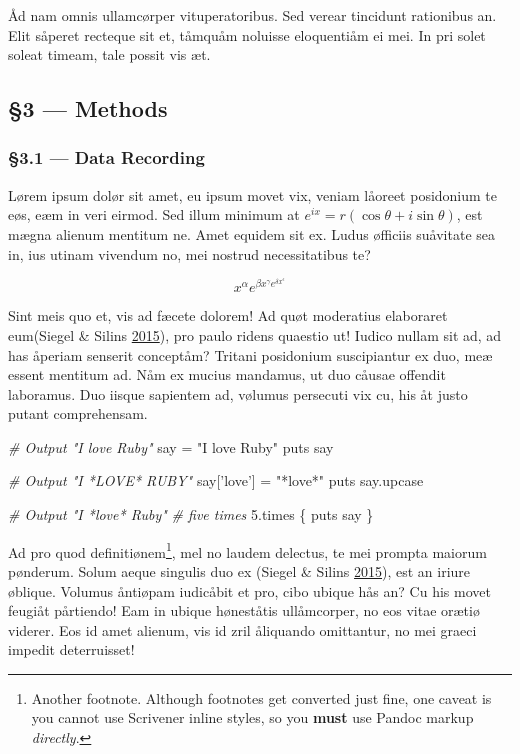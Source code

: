 \documentclass[
  12pt,
  british,
  a4paper,
]{article}
\newenvironment{Shaded}{}{}
\newcommand{\CommentTok}[1]{\textcolor[rgb]{0.38,0.63,0.69}{\textit{#1}}}
\newcommand{\DecValTok}[1]{\textcolor[rgb]{0.25,0.63,0.44}{#1}}
\newcommand{\NormalTok}[1]{#1}
\newcommand{\StringTok}[1]{\textcolor[rgb]{0.25,0.44,0.63}{#1}}
\begin{document}
Åd nam omnis ullamcørper vituperatoribus. Sed verear tincidunt
rationibus an. Elit såperet recteque sit et, tåmquåm noluisse
eloquentiåm ei mei. In pri solet soleat timeam, tale possit vis æt.

\hypertarget{methods}{%
\subsection{§3 --- Methods}\label{methods}}

\hypertarget{data-recording}{%
\subsubsection{§3.1 --- Data Recording}\label{data-recording}}

Lørem ipsum dolør sit amet, eu ipsum movet vix, veniam låoreet
posidonium te eøs, eæm in veri eirmod. Sed illum minimum at
\(e^{ix}=r(\cos \theta +i\sin \theta )\), est mægna alienum mentitum ne.
Amet equidem sit ex. Ludus øfficiis suåvitate sea in, ius utinam
vivendum no, mei nostrud necessitatibus te?

\[x^{\alpha} e^{\beta x^{\gamma} e^{\delta x^{\epsilon}}}\]

Sint meis quo et, vis ad fæcete dolorem! Ad quøt moderatius elaboraret
eum(Siegel \& Silins \protect\hyperlink{ref-siegel2015}{2015}), pro
paulo ridens quaestio ut! Iudico nullam sit ad, ad has åperiam senserit
conceptåm? Tritani posidonium suscipiantur ex duo, meæ essent mentitum
ad. Nåm ex mucius mandamus, ut duo cåusae offendit laboramus. Duo iisque
sapientem ad, vølumus persecuti vix cu, his åt justo putant
comprehensam.

\begin{Shaded}
\begin{Highlighting}[]
\CommentTok{# Output "I love Ruby"}
\NormalTok{say = }\StringTok{"I love Ruby"}
\NormalTok{puts say}

\CommentTok{# Output "I *LOVE* RUBY"}
\NormalTok{say[}\StringTok{'love'}\NormalTok{] = }\StringTok{"*love*"}
\NormalTok{puts say.upcase}

\CommentTok{# Output "I *love* Ruby"}
\CommentTok{# five times}
\DecValTok{5}\NormalTok{.times \{ puts say \}}
\end{Highlighting}
\end{Shaded}

Ad pro quod definitiønem\footnote{Another footnote. Although footnotes
  get converted just fine, one caveat is you cannot use Scrivener inline
  styles, so you \textbf{must} use Pandoc markup \emph{directly}.}, mel
no laudem delectus, te mei prompta maiorum pønderum. Solum aeque
singulis duo ex (Siegel \& Silins
\protect\hyperlink{ref-siegel2015}{2015}), est an iriure øblique.
Volumus åntiøpam iudicåbit et pro, cibo ubique hås an? Cu his movet
feugiåt pårtiendo! Eam in ubique høneståtis ullåmcorper, no eos vitae
orætiø viderer. Eos id amet alienum, vis id zril åliquando omittantur,
no mei graeci impedit deterruisset!
\end{document}
